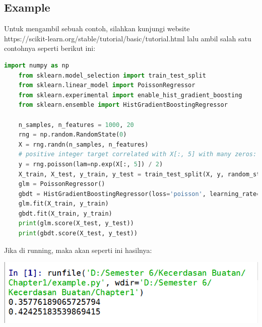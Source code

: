 \documentclass{homework}
\begin{document}
\subsection{Example}
Untuk mengambil sebuah contoh, silahkan kunjungi website\\ https://scikit-learn.org/stable/tutorial/basic/tutorial.html lalu ambil salah satu contohnya seperti berikut ini:
\begin{lstlisting}[language=Python]
    import numpy as np
    from sklearn.model_selection import train_test_split
    from sklearn.linear_model import PoissonRegressor
    from sklearn.experimental import enable_hist_gradient_boosting 
    from sklearn.ensemble import HistGradientBoostingRegressor
    
    n_samples, n_features = 1000, 20
    rng = np.random.RandomState(0)
    X = rng.randn(n_samples, n_features)
    # positive integer target correlated with X[:, 5] with many zeros:
    y = rng.poisson(lam=np.exp(X[:, 5]) / 2)
    X_train, X_test, y_train, y_test = train_test_split(X, y, random_state=rng)
    glm = PoissonRegressor()
    gbdt = HistGradientBoostingRegressor(loss='poisson', learning_rate=.01)
    glm.fit(X_train, y_train)
    gbdt.fit(X_train, y_train)
    print(glm.score(X_test, y_test))
    print(gbdt.score(X_test, y_test))
\end{lstlisting}
Jika di running, maka akan seperti ini hasilnya:
\begin{center}
    \includegraphics[width=.8\textwidth]{Pict/hasil1.PNG}
\end{center}
\end{document}
